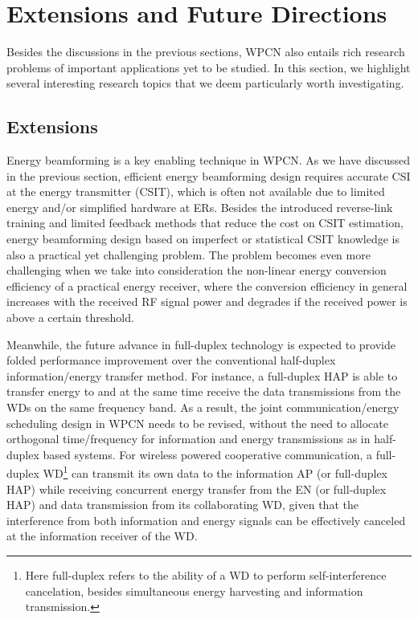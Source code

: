 \documentclass[journal, draftcls, one column, 12pt]{IEEEtran}
\begin{document}
\section{Extensions and Future Directions}
Besides the discussions in the previous sections, WPCN also entails rich research problems of important applications yet to be studied. In this section, we highlight several interesting research topics that we deem particularly worth investigating.

\subsection{Extensions}
Energy beamforming is a key enabling technique in WPCN. As we have discussed in the previous section, efficient energy beamforming design requires accurate CSI at the energy transmitter (CSIT), which is often not available due to limited energy and/or simplified hardware at ERs. Besides the introduced reverse-link training and limited feedback methods that reduce the cost on CSIT estimation, energy beamforming design based on imperfect or statistical CSIT knowledge is also a practical yet challenging problem. The problem becomes even more challenging when we take into consideration the non-linear energy conversion efficiency of a practical energy receiver, where the conversion efficiency in general increases with the received RF signal power and degrades if the received power is above a certain threshold.

Meanwhile, the future advance in full-duplex technology is expected to provide folded performance improvement over the conventional half-duplex information/energy transfer method. For instance, a full-duplex HAP is able to transfer energy to and at the same time receive the data transmissions from the WDs on the same frequency band. As a result, the joint communication/energy scheduling design in WPCN needs to be revised, without the need to allocate orthogonal time/frequency for information and energy transmissions as in half-duplex based systems. For wireless powered cooperative communication, a full-duplex WD\footnote{Here full-duplex refers to the ability of a WD to perform self-interference cancelation, besides simultaneous energy harvesting and information transmission.} can transmit its own data to the information AP (or full-duplex HAP) while receiving concurrent energy transfer from the EN (or full-duplex HAP) and data transmission from its collaborating WD, given that the interference from both information and energy signals can be effectively canceled at the information receiver of the WD.
\end{document}

